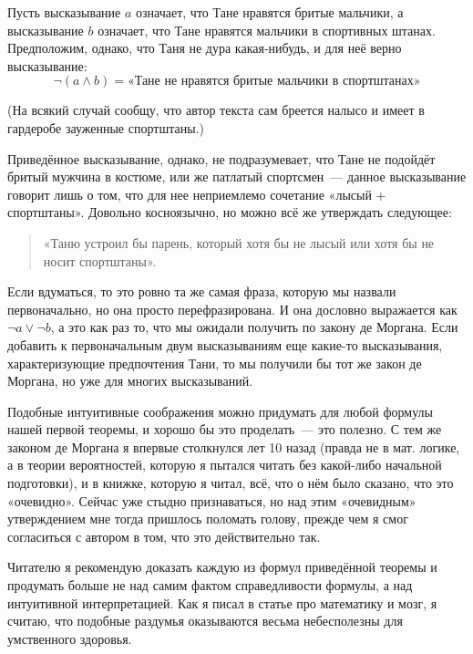 Пусть высказывание $a$ означает, что Тане нравятся бритые мальчики, а высказывание $b$ означает, что Тане нравятся мальчики в спортивных штанах. Предположим, однако, что Таня не дура какая-нибудь, и для неё верно высказывание:
$$
\neg(a \wedge b) = \mbox{«Тане не нравятся бритые мальчики в спортштанах»}
$$

(На всякий случай сообщу, что автор текста сам бреется налысо и имеет в гардеробе зауженные спортштаны.)

Приведённое высказывание, однако, не подразумевает, что Тане не подойдёт бритый мужчина в костюме, или же патлатый спортсмен~--- данное высказывание говорит лишь о том, что для нее неприемлемо сочетание «лысый + спортштаны». Довольно косноязычно, но можно всё же утверждать следующее:

\begin{quote}
«Таню устроил бы парень, который хотя бы не лысый или хотя бы не носит спортштаны».
\end{quote}

Если вдуматься, то это ровно та же самая фраза, которую мы назвали первоначально, но она просто перефразирована. И она дословно выражается как $\neg a \vee \neg b$, а это как раз то, что мы ожидали получить по закону де Моргана. Если добавить к первоначальным двум высказываниям еще какие-то высказывания, характеризующие предпочтения Тани, то мы получили бы тот же закон де Моргана, но уже для многих высказываний.

Подобные интуитивные соображения можно придумать для любой формулы нашей первой теоремы, и хорошо бы это проделать~--- это полезно. С тем же законом де Моргана я впервые столкнулся лет 10 назад (правда не в мат. логике, а в теории вероятностей, которую я пытался читать без какой-либо начальной подготовки), и в книжке, которую я читал, всё, что о нём было сказано, что это «очевидно». Сейчас уже стыдно признаваться, но над этим «очевидным» утверждением мне тогда пришлось поломать голову, прежде чем я смог согласиться с автором в том, что это действительно так.

Читателю я рекомендую доказать каждую из формул приведённой теоремы и продумать больше не над самим фактом справедливости формулы, а над интуитивной интерпретацией. Как я писал в статье про математику и мозг, я считаю, что подобные раздумья оказываются весьма небесполезны для умственного здоровья.



